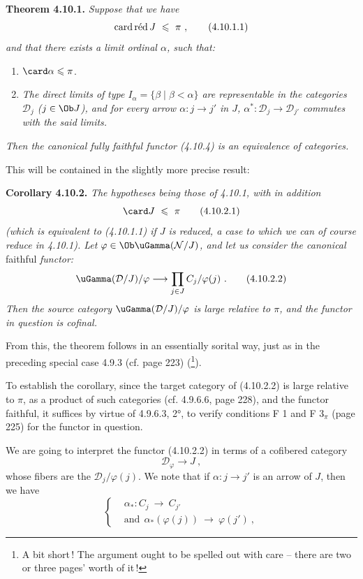 
\textbf{Theorem 4.10.1.} \textit{Suppose that we have}
\[
\mathrm{card}\,\textup{réd}\, J \ \leqslant \ \pi \ , \tag*{(4.10.1.1)}
\]
\textit{and that there exists a limit ordinal $\alpha$, such that:}
\begin{enumerate}[label={}, leftmargin=3em]
\item[\textit{1)}] $\card \alpha \leqslant \pi$.
\item[\textit{2)}] \textit{The direct limits of}
\textit{type $I_\alpha = \{\beta \mid \beta < \alpha\}$ are representable in the categories $\mathcal{D}_j$ ($j \in \Ob J$), and for every arrow $\alpha : j \longrightarrow j'$ in $J$, $\alpha^* : \mathcal{D}_j \longrightarrow \mathcal{D}_{j'}$ commutes with the said limits.}
\end{enumerate}
\textit{Then the canonical fully faithful functor (4.10.4) is an equivalence of categories.}

This will be contained in the slightly more precise result:

\textbf{Corollary 4.10.2.} \textit{The hypotheses being those of 4.10.1, with in addition}
\[
\card J \ \leqslant \ \pi \tag*{(4.10.2.1)}
\]
\textit{(which is equivalent to (4.10.1.1) if $J$ is reduced, a case to which we can of course reduce in 4.10.1). Let $\varphi \in \Ob \uGamma(\mathcal{N}/J)$, and let us consider the canonical} faithful \textit{functor:}
\[
\uGamma(\mathcal{D}/J)/\varphi \longrightarrow \prod_{j\in J} C_j/\varphi(j) \ . \tag*{(4.10.2.2)}
\]
\textit{Then the source category $\uGamma(\mathcal{D}/J)/\varphi$ is large relative to $\pi$, and the functor in question is cofinal.}

From this, the theorem follows in an essentially sorital way, just as in the preceding special case 4.9.3 (cf. page 223) (\footnote{A bit short\,! The argument ought to be spelled out with care – there are two or three pages' worth of it\,!}).

To establish the corollary, since the target category of (4.10.2.2) is large relative to $\pi$, as a product of such categories (cf. 4.9.6.6, page 228), and the functor faithful, it suffices by virtue of 4.9.6.3, 2°, to verify conditions F 1 and F 3$_\pi$ (page 225) for the functor in question.

We are going to interpret the functor (4.10.2.2) in terms of a cofibered category
\[
\mathcal{D}_\varphi \longrightarrow J \ , \tag*{(4.10.5)}
\]
whose fibers are the $\mathcal{D}_j/\varphi(j)$. We note that if $\alpha : j \longrightarrow j'$ is an arrow of $J$, then we have
\[
\left\{
\begin{aligned}
&\alpha_* : C_j \ \longrightarrow \ C_{j'} \\
&\text{and} \ \ \alpha_*(\varphi(j)) \ \longrightarrow \ \varphi(j') \ ,
\end{aligned}
\right.
\]


